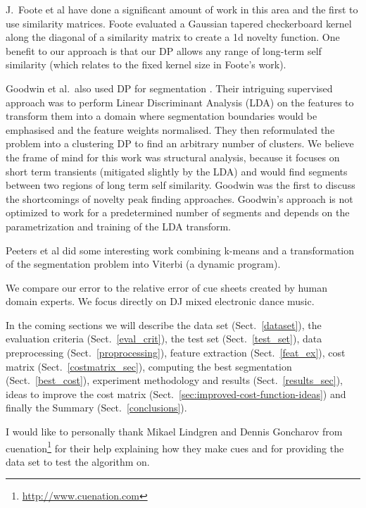 \documentclass[twocolumn]{article}
\begin{document}
J.\ Foote et al \citep{foote1999visualizing,foote1997similarity,foote2000automatic,foote2003media,foote2001visualizing} have done a significant amount of work in this area and the first to use similarity matrices. Foote evaluated a Gaussian tapered checkerboard kernel along the diagonal of a similarity matrix to create a 1d novelty function. One benefit to our approach is that our DP allows any range of long-term self similarity (which relates to the fixed kernel size in Foote's work).

Goodwin et al.\ also used DP for segmentation \citep{goodwin2003audio,goodwin2004dynamic}. Their intriguing supervised approach was to perform Linear Discriminant Analysis (LDA) on the features to transform them into a domain where segmentation boundaries would be emphasised and the feature weights normalised. They then reformulated the problem into a clustering DP to find an arbitrary number of clusters. We believe the frame of mind for this work was structural analysis, because it focuses on short term transients (mitigated slightly by the LDA) and would find segments between two regions of long term self similarity. Goodwin was the first to discuss the shortcomings of novelty peak finding approaches. Goodwin's approach is not optimized to work for a predetermined number of segments and depends on the parametrization and training of the LDA transform. 

Peeters et al \citep{peeters2002toward,peeters2004deriving} did some interesting work combining k-means and a transformation of the segmentation problem into Viterbi (a dynamic program).

We compare our error to the relative error of cue sheets created by human domain experts. We focus directly on DJ mixed electronic dance music.

In the coming sections we will describe the data set (Sect.~\ref{dataset}), the evaluation criteria (Sect.~\ref{eval_crit}), the test set (Sect.~\ref{test_set}), data preprocessing (Sect.~\ref{proprocessing}), feature extraction (Sect.~\ref{feat_ex}), cost matrix (Sect.~\ref{costmatrix_sec}), computing the best segmentation (Sect.~\ref{best_cost}), experiment methodology and results (Sect.~\ref{results_sec}), ideas to improve the cost matrix (Sect.~\ref{sec:improved-cost-function-ideas}) and finally the Summary (Sect.~\ref{conclusions}).

I would like to personally thank Mikael Lindgren and Dennis Goncharov from cuenation\footnote{\url{http://www.cuenation.com}} for their help explaining how they make cues and for providing the data set to test the algorithm on.
\end{document}
